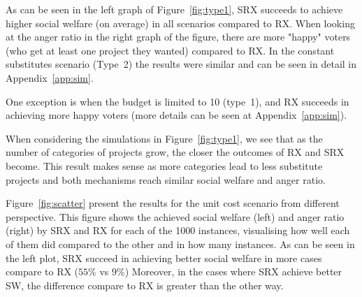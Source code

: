 \documentclass[runningheads]{llncs}
\begin{document}
As can be seen in the left graph of Figure~\ref{fig:type1}, SRX succeeds to achieve higher social welfare (on average) in all scenarios compared to RX. When looking at the anger ratio in the right graph of the figure, there are more "happy" voters (who get at least one project they wanted) compared to RX. In the constant substitutes scenario (Type~2) the results were similar and can be seen in detail in Appendix~\ref{app:sim}.




One exception is when the budget is limited to 10 (type~1), and RX succeeds in achieving  more happy voters (more details can be seen at Appendix~\ref{app:sim}).

When considering the   simulations in Figure~\ref{fig:type1}, we   see that as the number of categories of projects grow, the closer  the outcomes of RX and SRX become. This result makes sense as  more categories lead to  less  substitute projects and both mechanisms reach similar social welfare and anger ratio. 

Figure~\ref{fig:scatter} present the results for the unit cost scenario from different perspective. This figure shows the achieved social welfare (left) and anger ratio (right) by SRX and RX for each of the 1000 instances, visualising how well each of them did compared to the other and in how many instances. As can be seen in the left plot, SRX succeed in achieving better social welfare in more cases compare to RX ($55\%$ vs $9\%$) Moreover, in the cases where SRX achieve better SW, the difference compare to RX is greater than the other way.
\end{document}
